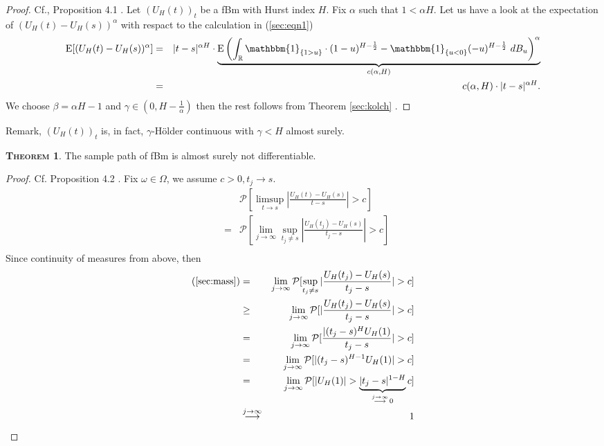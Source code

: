 \documentclass[a4paper, twoside, 11pt]{article}
\theoremstyle{definition}
\newtheorem{theorem}[definition]{\scshape Theorem}
\newcommand{\brkt}[1]{\left({#1} \right)}
\begin{document}
  \begin{proof}
	Cf.\cite{mandelbrot}, Proposition 4.1 . Let $(U_H(t))_{t}$ be a fBm with Hurst index $H$. Fix $\alpha$ such that $1 < \alpha H$. Let us have a look at the expectation of $(U_H(t) - U_H(s))^\alpha$ with respact to the calculation in (\ref{sec:eqn1})
	\begin{eqnarray}
	  \mathrm{E} [(U_H(t) - U_H(s))^\alpha] &=& |t-s|^{\alpha H} \cdot \underbrace{\mathrm{E}\brkt{\int_{\mathbb{R}} \mathbbm{1}_{\{1 > u\}}\cdot (1-u)^{H-\frac{1}{2}} - \mathbbm{1}_{\{u < 0\}} (-u)^{H-\frac{1}{2}} \, \mathop{dB_u}}^\alpha}_{c(\alpha,H)}\nonumber\\
	  &=& c(\alpha,H) \cdot |t-s|^{\alpha H}.
	  \label{sec:eqn5}
	\end{eqnarray}
	We choose $\beta = \alpha H -1$ and $\gamma \in (0, H-\frac{1}{\alpha})$ then the rest follows from Theorem \ref{sec:kolch} .
  \end{proof}

  Remark, $(U_H(t))_t$ is, in fact, $\gamma$-H\"older continuous with $\gamma < H$ almost surely.

  \begin{theorem}
	The sample path of fBm is almost surely not differentiable.
  \end{theorem}

  \begin{proof}
	Cf. \cite{mandelbrot} Proposition 4.2 . Fix $\omega \in \Omega$, we assume $c > 0, t_j \rightarrow s$.
  \begin{eqnarray}
   && \mathcal{P}[\limsup\limits_{t\rightarrow s} |\frac{U_H(t) - U_H(s)}{t-s}| > c]\nonumber\\
   &=& \mathcal{P}[\lim\limits_{j\rightarrow\infty}\sup\limits_{t_j\neq s} |\frac{U_H(t_j) - U_H(s)}{t_j-s}| > c]\nonumber\\
   \label{sec:mass}
   \end{eqnarray}
   Since continuity of measures from above, then
   \begin{eqnarray*}
   \text{(\ref{sec:mass})} &=& \lim\limits_{j\rightarrow\infty} \mathcal{P}[\sup\limits_{t_j\neq s} |\frac{U_H(t_j) - U_H(s)}{t_j-s}| > c]\\
   &\ge& \lim\limits_{j\rightarrow\infty} \mathcal{P}[|\frac{U_H(t_j) - U_H(s)}{t_j-s}| > c]\\
   &=& \lim\limits_{j\rightarrow\infty} \mathcal{P}[\frac{|(t_j-s)^{H}U_H(1)}{t_j - s}| > c]\\
   &=& \lim\limits_{j\rightarrow\infty} \mathcal{P}[|(t_j-s)^{H-1}U_H(1)| > c]\\
   &=& \lim\limits_{j\rightarrow\infty} \mathcal{P}[|U_H(1)| > \underbrace{|t_j - s|^{1-H}}_{\overset{j\rightarrow\infty}{\longrightarrow}\, 0}c]\\
   &\overset{j\rightarrow \infty}{\longrightarrow}& 1 
  \end{eqnarray*}
  \end{proof}
\end{document}
